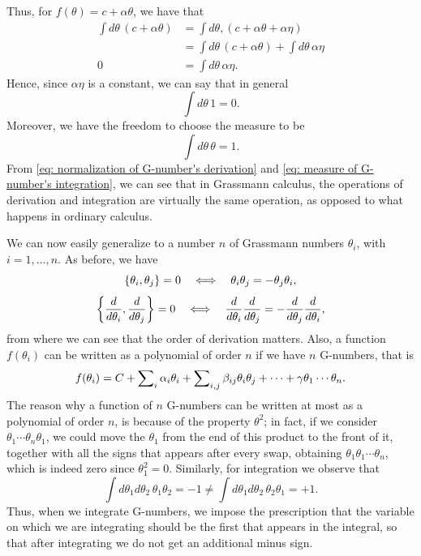Thus, for $f(\theta) = c + \alpha\theta$, we have that
\begin{equation}
    \begin{split}
    \int d\theta\,(c + \alpha\theta) &= \int d\theta,(c + \alpha\theta + \alpha\eta) \\
    &= \int d\theta\,(c + \alpha\theta) + \int d\theta\,\alpha\eta \\
    0 &= \int d\theta\,\alpha\eta.
    \end{split}
\end{equation}
Hence, since $\alpha\eta$ is a constant, we can say that in general 
\begin{equation}
    \int d\theta\,1 = 0.
\end{equation}
Moreover, we have the freedom to choose the measure to be 
\begin{equation}
\label{eq: measure of G-number's integration}
    \int d\theta\,\theta = 1.
\end{equation}
From \eqref{eq: normalization of G-number's derivation} and \eqref{eq: measure of G-number's integration}, we can see that in Grassmann calculus, the operations of derivation and integration are virtually the same operation, as opposed to what happens in ordinary calculus. 

We can now easily generalize to a number $n$ of Grassmann numbers $\theta_i$, with $i = 1,\dots,n$. As before, we have 
\begin{equation}
    \{\theta_i,\theta_j\} = 0 \quad\Longleftrightarrow\quad \theta_i\theta_j = -\theta_j\theta_i,
\end{equation}
\begin{equation}
     \bigg\{\frac{d}{d\theta_i},\frac{d}{d\theta_j}\bigg\} = 0 \quad\Longleftrightarrow\quad \frac{d}{d\theta_i}\frac{d}{d\theta_j} = -\frac{d}{d\theta_j}\frac{d}{d\theta_i},
\end{equation}
from where we can see that the order of derivation matters. Also, a function $f(\theta_i)$ can be written as a polynomial of order $n$ if we have $n$ G-numbers, that is 
\begin{equation}
    f(\theta_i) = C + \sum\nolimits_i\alpha_i\theta_i + \sum\nolimits_{i,j}\beta_{ij}\theta_i\theta_j + \cdots + \gamma\theta_1\cdots\theta_n.
\end{equation}
The reason why a function of $n$ G-numbers can be written at most as a polynomial of order $n$, is because of the property $\theta^2$; in fact, if we consider $\theta_1\cdots\theta_{n}\theta_{1}$, we could move the $\theta_1$ from the end of this product to the front of it, together with all the signs that appears after every swap, obtaining $\theta_1\theta_{1}\cdots\theta_{n}$, which is indeed zero since $\theta_1^2 = 0$. Similarly, for integration we observe that 
\begin{equation}
    \int d\theta_1d\theta_2\, \theta_1\theta_2 = - 1 \neq \int d\theta_1d\theta_2\, \theta_2\theta_1 = + 1.
\end{equation}
Thus, when we integrate G-numbers, we impose the prescription that the variable on which we are integrating should be the first that appears in the integral, so that after integrating we do not get an additional minus sign.

